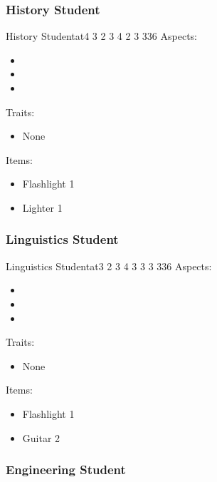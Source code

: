 \documentclass[11pt]{article}
\begin{document}
{\subsubsection{History Student}
\label{sec:orga1bb4f2}

\begin{npc}{History Student}{at}{4 3 2 3 4 2 3 3}{36}
Aspects:
\begin{itemize}
\item {}
\item {}
\item {}
\end{itemize}
\columnbreak

Traits:
\begin{itemize}
\item None
\end{itemize}

Items:
\begin{itemize}
\item Flashlight 1
\item Lighter 1
\end{itemize}
\end{npc}
\subsubsection{Linguistics Student}
\label{sec:org5bb4d65}

\begin{npc}{Linguistics Student}{at}{3 2 3 4 3 3 3 3}{36}
Aspects:
\begin{itemize}
\item {}
\item {}
\item {}
\end{itemize}
\columnbreak

Traits:
\begin{itemize}
\item None
\end{itemize}

Items:
\begin{itemize}
\item Flashlight 1
\item Guitar 2
\end{itemize}
\end{npc}
\subsubsection{Engineering Student}
\label{sec:orge5f121a}

}
\end{document}
